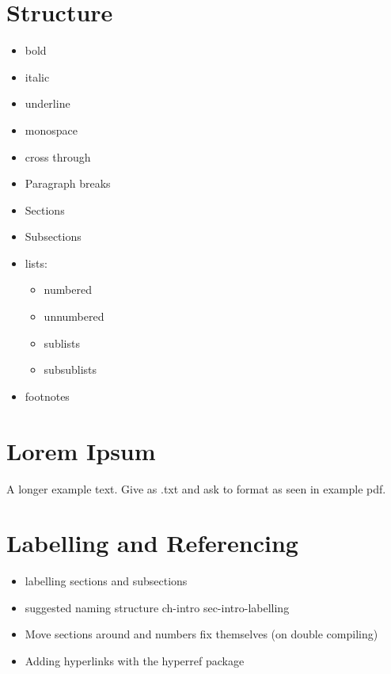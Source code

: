 \documentclass[
]{book}
\providecommand{\tightlist}{%
  \setlength{\itemsep}{0pt}\setlength{\parskip}{0pt}}
\begin{document}
\hypertarget{structure}{%
\section{Structure}\label{structure}}

\begin{itemize}
\item
  bold
\item
  italic
\item
  underline
\item
  monospace
\item
  cross through
\item
  Paragraph breaks
\item
  Sections
\item
  Subsections
\item
  lists:

  \begin{itemize}
  \tightlist
  \item
    numbered\\
  \item
    unnumbered
  \item
    sublists
  \item
    subsublists
  \end{itemize}
\item
  footnotes
\end{itemize}

\hypertarget{lorem-ipsum}{%
\section{Lorem Ipsum}\label{lorem-ipsum}}

A longer example text. Give as .txt and ask to format as seen in example pdf.

\hypertarget{labelling-and-referencing}{%
\section{Labelling and Referencing}\label{labelling-and-referencing}}

\begin{itemize}
\tightlist
\item
  labelling sections and subsections
\item
  suggested naming structure ch-intro sec-intro-labelling
\item
  Move sections around and numbers fix themselves (on double compiling)
\item
  Adding hyperlinks with the hyperref package
\end{itemize}
\end{document}

